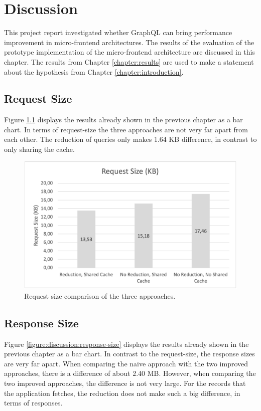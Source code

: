 \chapter{Discussion}\label{chapter:discussion}

This project report investigated whether GraphQL can bring performance improvement in micro-frontend architectures. The results of the evaluation of the prototype implementation of the micro-frontend architecture are discussed in this chapter. The results from Chapter \ref{chapter:results} are used to make a statement about the hypothesis from Chapter \ref{chapter:introduction}.

\section{Request Size}

Figure \ref{figure:discussion:request-size} displays the results already shown in the previous chapter as a bar chart. In terms of request-size the three approaches are not very far apart from each other. The reduction of queries only makes 1.64 KB difference, in contrast to only sharing the cache.

\ifshowImages
\begin{figure}[H]
\centering
\includegraphics[width=0.8\linewidth]{images/discussion/request-size.png}
\caption{Request size comparison of the three approaches.}\label{figure:discussion:request-size}
\end{figure}
\fi

\section{Response Size}

Figure \ref{figure:discussion:response-size} displays the results already shown in the previous chapter as a bar chart. In contrast to the request-size, the response sizes are very far apart. When comparing the naive approach with the two improved approaches, there is a difference of about 2.40 MB. However, when comparing the two improved approaches, the difference is not very large. For the records that the application fetches, the reduction does not make such a big difference, in terms of responses.

